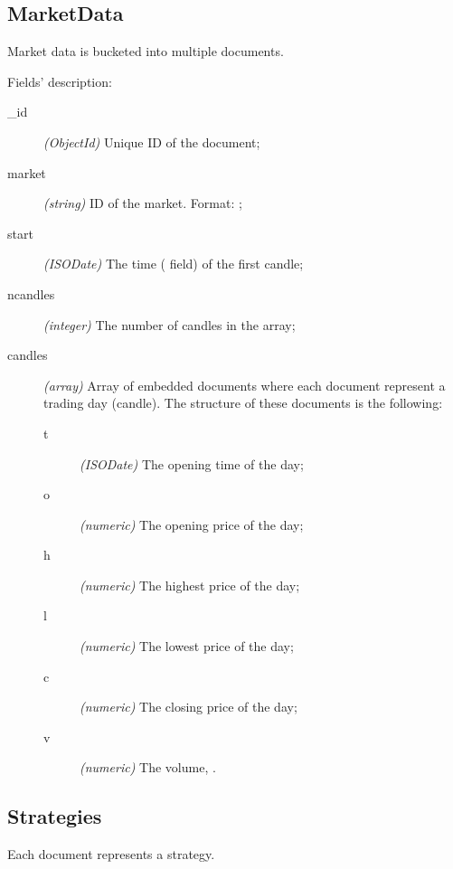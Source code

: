 \subsection{MarketData}

Market data is bucketed into multiple documents.



Fields' description:
\begin{description}
	\item[\_id] \textit{(ObjectId)} Unique ID of the document;
	\item[market] \textit{(string)} ID of the market. Format:
		;
	\item[start] \textit{(ISODate)} The time ( field) of the first
		candle;
	\item[ncandles] \textit{(integer)} The number of candles in the
		 array;
	\item[candles] \textit{(array)} Array of embedded documents where each
		document represent a trading day (candle). The structure of
		these documents is the following:
		\begin{description}
			\item[t] \textit{(ISODate)} The opening time of the
				day;
			\item[o] \textit{(numeric)} The opening price of the
				day;
			\item[h] \textit{(numeric)} The highest price of the
				day;
			\item[l] \textit{(numeric)} The lowest price of the day;
			\item[c] \textit{(numeric)} The closing price of the
				day;
			\item[v] \textit{(numeric)} The volume, .
		\end{description}
\end{description}

\subsection{Strategies}

Each document represents a strategy.



